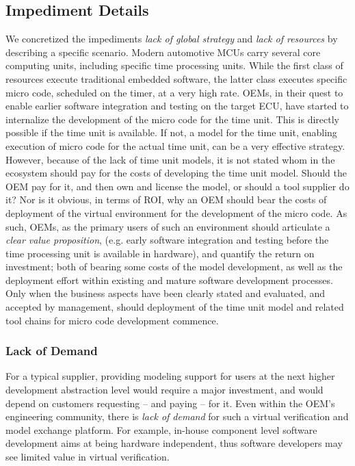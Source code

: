 \subsection{Impediment Details}
We concretized the impediments \emph{lack of global strategy} and \emph{lack of resources} by describing a specific scenario.
Modern automotive MCUs carry several core computing units, including specific time processing units.
While the first class of resources execute traditional embedded software, the latter class executes specific micro code, scheduled on the timer, at a very high rate.
OEMs, in their quest to enable earlier software integration and testing on the target ECU, have started to internalize the development of the micro code for the time unit.
This is directly possible if the time unit is available.
If not, a model for the time unit, enabling execution of micro code for the actual time unit, can be a very effective strategy.
However, because of the lack of time unit models, it is not stated whom in the ecosystem should pay for the costs of developing the time unit model.
Should the OEM pay for it, and then own and license the model, or should a tool supplier do it?
Nor is it obvious, in terms of ROI, why an OEM should bear the costs of deployment of the virtual environment for the development of the micro code.
As such, OEMs, as the primary users of such an environment should articulate a \emph{clear value proposition}, (e.g. early software integration and testing before the time processing unit is available in hardware), and quantify the return on investment;
both of bearing some costs of the model development, as well as the deployment effort within existing and mature software development processes.
Only when the business aspects have been clearly stated and evaluated, and accepted by management, should deployment of the time unit model and related tool chains for micro code development commence.


\subsubsection*{Lack of Demand}
For a typical supplier, providing modeling support for users at the next higher development abstraction level would require a major investment, and would depend on customers requesting -- and paying -- for it.
%
Even within the OEM's engineering community, there is \emph{lack of demand} for such a virtual verification and model exchange platform.
For example, in-house component level software development aims at being hardware independent, thus software developers may see limited value in virtual verification.


